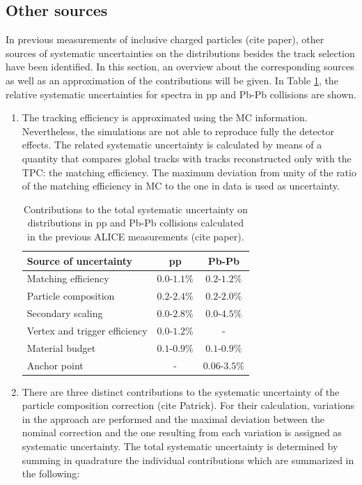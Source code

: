 \documentclass[12pt,a4paper]{report}
\begin{document}
\subsection{Other sources} 
In previous measurements of inclusive charged particles (cite paper), other sources of systematic uncertainties on the \pt distributions besides the track selection have been identified. In this section, an overview about the corresponding sources as well as an approximation of the contributions will be given. In Table \ref{tab:othersources}, the relative systematic uncertainties for \pt spectra in pp and Pb-Pb collisions are shown. 
\begin{enumerate} 
\item The tracking efficiency is approximated using the MC information. Nevertheless, the simulations are not able  to reproduce fully the detector effects. The related systematic uncertainty is calculated by means of a quantity that compares global tracks with tracks reconstructed only with the TPC: the matching efficiency. The maximum deviation from unity of the ratio of the matching efficiency in MC to the one in data is used as uncertainty.
\begin{table}[tb!]
\renewcommand{\arraystretch}{1.5}
\centering
\begin{tabular}{l c c}
\toprule
\rowcolor{headerBlue}  \textbf{Source of uncertainty} &  \textbf{pp}  &   \textbf{Pb-Pb}  \\
\midrule
\midrule
Matching efficiency & $0.0$-$1.1\%$  & $0.2$-$1.2\%$\\
Particle composition & $0.2$-$2.4\%$ & $0.2$-$2.0\%$\\
Secondary scaling & $0.0$-$2.8\%$ & $0.0$-$4.5\%$ \\
Vertex and trigger efficiency & $0.0$-$1.2\%$ & - \\
Material budget & $0.1$-$0.9\%$ & $0.1$-$0.9\%$ \\
Anchor point & - & $0.06$-$3.5\%$ \\
\bottomrule
\end{tabular}
\caption{Contributions to the total systematic uncertainty on \pt distributions in pp and Pb-Pb collisions calculated in the previous ALICE measurements (cite paper).}
\label{tab:othersources}
\end{table}
\item There are three distinct contributions to the systematic uncertainty of the particle composition correction (cite Patrick). For their calculation, variations in the approach are performed and the maximal deviation between the nominal correction and the one resulting from each variation is assigned as systematic uncertainty. The total systematic uncertainty is determined by summing in quadrature the individual contributions which are summarized in the following:

\end{enumerate}
\end{document}
